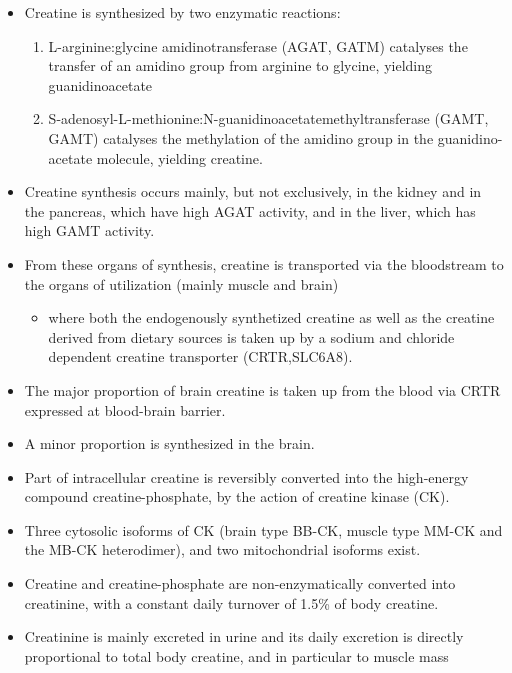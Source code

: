 \documentclass{scrartcl}
\begin{document}
\begin{itemize}
\item Creatine is synthesized by two enzymatic reactions:
\begin{enumerate}
\item L-arginine:glycine amidinotransferase (AGAT, GATM) catalyses the
transfer of an amidino group from arginine to glycine, yielding
guanidinoacetate
\item S-adenosyl-L-methionine:N-guanidinoacetatemethyltransferase
(GAMT, GAMT) catalyses the methylation of the amidino group in
the guanidino-acetate molecule, yielding creatine.
\end{enumerate}

\item Creatine synthesis occurs mainly, but not exclusively, in the kidney
and in the pancreas, which have high AGAT activity, and in the
liver, which has high GAMT activity.

\item From these organs of synthesis, creatine is transported via the
bloodstream to the organs of utilization (mainly muscle and brain)
\begin{itemize}
\item where both the endogenously synthetized creatine as well as the
creatine derived from dietary sources is taken up by a sodium and
chloride dependent creatine transporter (CRTR,SLC6A8).
\end{itemize}

\item The major proportion of brain creatine is taken up from the blood
via CRTR expressed at blood-brain barrier.

\item A minor proportion is synthesized in the brain.

\item Part of intracellular creatine is reversibly converted into the
high-energy compound creatine-phosphate, by the action of creatine
kinase (CK).

\item Three cytosolic isoforms of CK (brain type BB-CK, muscle type MM-CK
and the MB-CK heterodimer), and two mitochondrial isoforms exist.

\item Creatine and creatine-phosphate are non-enzymatically converted into
creatinine, with a constant daily turnover of 1.5\% of body
creatine.

\item Creatinine is mainly excreted in urine and its daily excretion is
directly proportional to total body creatine, and in particular to
muscle mass
\end{itemize}
\end{document}
